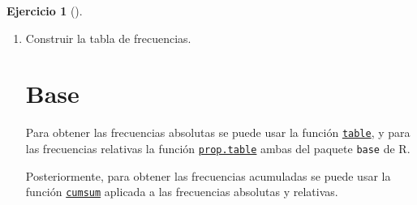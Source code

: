 \documentclass[
  spanish,
  a4paper,
]{scrreport}
\newenvironment{Shaded}{\begin{snugshade}}{\end{snugshade}}
\newcommand{\AttributeTok}[1]{\textcolor[rgb]{0.40,0.45,0.13}{#1}}
\newcommand{\DecValTok}[1]{\textcolor[rgb]{0.68,0.00,0.00}{#1}}
\newcommand{\FunctionTok}[1]{\textcolor[rgb]{0.28,0.35,0.67}{#1}}
\newcommand{\NormalTok}[1]{\textcolor[rgb]{0.00,0.23,0.31}{#1}}
\newcommand{\OtherTok}[1]{\textcolor[rgb]{0.00,0.23,0.31}{#1}}
\theoremstyle{definition}
\newtheorem{exercise}{Ejercicio}[chapter]
\theoremstyle{remark}
\begin{document}
\begin{exercise}[]
\begin{enumerate}
\begin{tcolorbox}
\begin{Shaded}
\begin{Highlighting}[]
\FunctionTok{library}\NormalTok{(tidyverse)}
\NormalTok{df }\OtherTok{\textless{}{-}} \FunctionTok{tibble}\NormalTok{(}\AttributeTok{hijos =} \FunctionTok{c}\NormalTok{(}\DecValTok{1}\NormalTok{, }\DecValTok{2}\NormalTok{, }\DecValTok{4}\NormalTok{, }\DecValTok{2}\NormalTok{, }\DecValTok{2}\NormalTok{, }\DecValTok{2}\NormalTok{, }\DecValTok{3}\NormalTok{, }\DecValTok{2}\NormalTok{, }\DecValTok{1}\NormalTok{, }\DecValTok{1}\NormalTok{, }\DecValTok{0}\NormalTok{, }\DecValTok{2}\NormalTok{, }\DecValTok{2}\NormalTok{, }\DecValTok{0}\NormalTok{, }\DecValTok{2}\NormalTok{, }\DecValTok{2}\NormalTok{, }\DecValTok{1}\NormalTok{, }\DecValTok{2}\NormalTok{, }\DecValTok{2}\NormalTok{, }\DecValTok{3}\NormalTok{, }\DecValTok{1}\NormalTok{, }\DecValTok{2}\NormalTok{, }\DecValTok{2}\NormalTok{, }\DecValTok{1}\NormalTok{, }\DecValTok{2}\NormalTok{))}
\end{Highlighting}
\end{Shaded}

  \end{tcolorbox}
\item
  Construir la tabla de frecuencias.

  \begin{tcolorbox}[enhanced jigsaw, titlerule=0mm, arc=.35mm, rightrule=.15mm, opacitybacktitle=0.6, leftrule=.75mm, colframe=quarto-callout-tip-color-frame, toptitle=1mm, breakable, colbacktitle=quarto-callout-tip-color!10!white, bottomrule=.15mm, colback=white, left=2mm, bottomtitle=1mm, opacityback=0, title=\textcolor{quarto-callout-tip-color}{\faLightbulb}\hspace{0.5em}{Solución}, toprule=.15mm, coltitle=black]

  \section{Base}

  Para obtener las frecuencias absolutas se puede usar la función
  \href{https://www.rdocumentation.org/packages/base/versions/3.6.2/topics/table}{\texttt{table}},
  y para las frecuencias relativas la función
  \href{https://www.rdocumentation.org/packages/base/versions/3.6.2/topics/prop.table}{\texttt{prop.table}}
  ambas del paquete \texttt{base} de R.

  Posteriormente, para obtener las frecuencias acumuladas se puede usar
  la función
  \href{https://www.rdocumentation.org/packages/base/versions/3.6.2/topics/cumsum}{\texttt{cumsum}}
  aplicada a las frecuencias absolutas y relativas.


\end{tcolorbox}
\end{enumerate}
\end{exercise}
\end{document}
